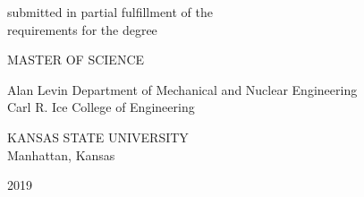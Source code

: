 \begin{center}
   \vspace{0.3cm}
   \begin{singlespace}
   submitted in partial fulfillment of the\\
   requirements for the degree\\
   \end{singlespace}

   \vspace{0.3cm}


   {\large MASTER OF SCIENCE}\\
   \vspace{0.3cm}


   \begin{singlespace}
   Alan Levin Department of Mechanical and Nuclear Engineering\\
   Carl R. Ice College of Engineering\\
   \end{singlespace}

   \vspace{0.3cm}

   \begin{singlespace}
   {\large KANSAS STATE UNIVERSITY}\\
   Manhattan, Kansas\\
   \end{singlespace}


   2019\\
   \vspace{0.3cm}

    \end{center}

